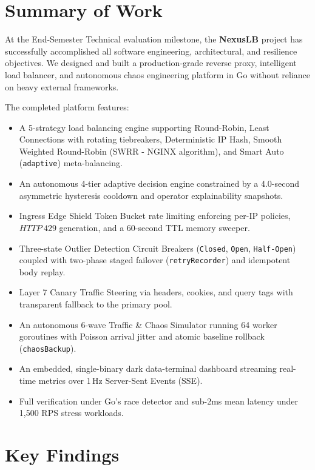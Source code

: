 \documentclass[12pt,openany]{report}
\begin{document}
\section{Summary of Work}

At the End-Semester Technical evaluation milestone, the \textbf{NexusLB} project has successfully accomplished all software engineering, architectural, and resilience objectives. We designed and built a production-grade reverse proxy, intelligent load balancer, and autonomous chaos engineering platform in Go without reliance on heavy external frameworks. 

The completed platform features:
\begin{itemize}
  \item A 5-strategy load balancing engine supporting Round-Robin, Least Connections with rotating tiebreakers, Deterministic IP Hash, Smooth Weighted Round-Robin (SWRR - NGINX algorithm), and Smart Auto (\texttt{adaptive}) meta-balancing.
  \item An autonomous 4-tier adaptive decision engine constrained by a 4.0-second asymmetric hysteresis cooldown and operator explainability snapshots.
  \item Ingress Edge Shield Token Bucket rate limiting enforcing per-IP policies, $HTTP~429$ generation, and a 60-second TTL memory sweeper.
  \item Three-state Outlier Detection Circuit Breakers (\texttt{Closed}, \texttt{Open}, \texttt{Half-Open}) coupled with two-phase staged failover (\texttt{retryRecorder}) and idempotent body replay.
  \item Layer 7 Canary Traffic Steering via headers, cookies, and query tags with transparent fallback to the primary pool.
  \item An autonomous 6-wave Traffic & Chaos Simulator running 64 worker goroutines with Poisson arrival jitter and atomic baseline rollback (\texttt{chaosBackup}).
  \item An embedded, single-binary dark data-terminal dashboard streaming real-time metrics over 1\,Hz Server-Sent Events (SSE).
  \item Full verification under Go's race detector and sub-2ms mean latency under 1,500 RPS stress workloads.
\end{itemize}

\section{Key Findings}
\end{document}
